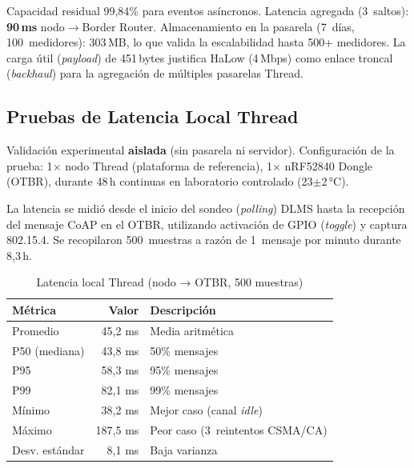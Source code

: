Capacidad residual 99,84\% para eventos asíncronos. Latencia agregada (3~saltos): \textbf{90\,ms} nodo$\rightarrow$Border Router. Almacenamiento en la pasarela (7~días, 100~medidores): 303\,MB, lo que valida la escalabilidad hasta 500+ medidores. La carga útil (\emph{payload}) de 451\,bytes justifica HaLow (4\,Mbps) como enlace troncal (\emph{backhaul}) para la agregación de múltiples pasarelas Thread.

\subsection{Pruebas de Latencia Local Thread}
\label{sec:nodo-pruebas-latencia}

Validación experimental \textbf{aislada} (sin pasarela ni servidor).  Configuración de la prueba: 1$\times$ nodo Thread (plataforma de referencia), 1$\times$ nRF52840 Dongle (OTBR), durante 48\,h continuas en laboratorio controlado (23$\pm$2\,°C).


La latencia se midió desde el inicio del sondeo (\emph{polling}) DLMS hasta la recepción del mensaje CoAP en el OTBR, utilizando activación de GPIO (\emph{toggle}) y captura 802.15.4. Se recopilaron 500~muestras a razón de 1~mensaje por minuto durante 8,3\,h.

\begin{table}[H]
\centering
\caption{Latencia local Thread (nodo → OTBR, 500 muestras)}
\label{tab:latencia-thread}
\footnotesize
\begin{tabular}{|l|r|l|}
\hline
\rowcolor{gray!20}
\textbf{Métrica} & \textbf{Valor} & \textbf{Descripción} \\
\hline
Promedio & 45,2 ms & Media aritmética \\
\hline
P50 (mediana) & 43,8 ms & 50\% mensajes \\
\hline
P95 & 58,3 ms & 95\% mensajes \\
\hline
P99 & 82,1 ms & 99\% mensajes \\
\hline
Mínimo & 38,2 ms & Mejor caso (canal \emph{idle}) \\
\hline
Máximo & 187,5 ms & Peor caso (3~reintentos CSMA/CA) \\
\hline
Desv. estándar & 8,1 ms & Baja varianza \\
\hline
\end{tabular}
\end{table}

